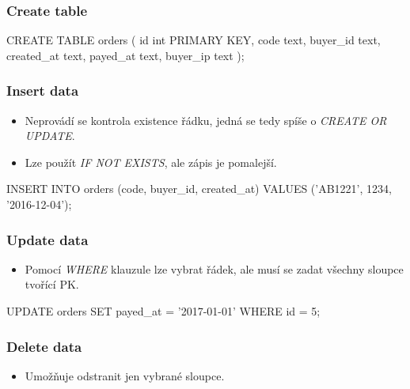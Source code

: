 \documentclass{article}
\begin{document}
      \subsubsection{Create table}
        \begin{listings}[language=cql]
          CREATE TABLE orders (
            id int PRIMARY KEY,
            code text,
            buyer_id text,
            created_at text,
            payed_at text,
            buyer_ip text
           );
        \end{listings}

      \subsubsection{Insert data}
        \begin{itemize}
          \item Neprovádí se kontrola existence řádku, jedná se tedy spíše o \emph{CREATE OR UPDATE}.
          \item Lze použít \emph{IF NOT EXISTS}, ale zápis je pomalejší.
        \end{itemize}

        \begin{listings}[language=cql]
          INSERT INTO orders (code, buyer_id, created_at)
          VALUES ('AB1221', 1234, '2016-12-04');
        \end{listings}

      \subsubsection{Update data}
        \begin{itemize}
          \item Pomocí \emph{WHERE} klauzule lze vybrat řádek, ale musí se zadat všechny sloupce tvořící PK.
        \end{itemize}

        \begin{listings}[language=cql]
          UPDATE orders
          SET payed_at = '2017-01-01'
          WHERE id = 5;
        \end{listings}

      \subsubsection{Delete data}
        \begin{itemize}
          \item Umožňuje odstranit jen vybrané sloupce.
        \end{itemize}
\end{document}
